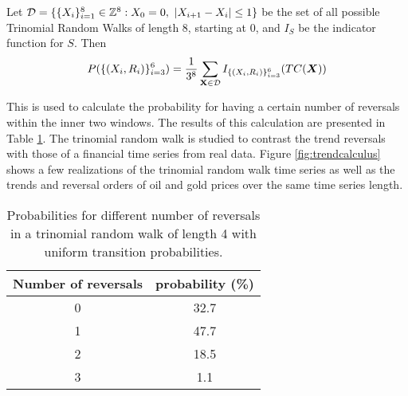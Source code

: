 \documentclass[../trend-calculus.tex]{subfiles}
\begin{document}
  Let $\mathcal{D} = \{ \{X_i\}_{i=1}^8 \in \mathbb{Z}^8 : X_0 = 0,\ |X_{i+1} - X_i| \le 1 \}$ be 
  the set of all possible Trinomial Random Walks of length 8, starting at 0, and 
  $I_S$ be the indicator function for $S$.
  Then 
  \[ 
    P( \{ (X_i, R_i) \}_{i=3}^6 ) = 
      \frac{1}{3^8} \sum_{\textbf{X} \in \mathcal{D}} 
        I_{ \{ (X_i, R_i) \}_{i=3}^6 } (TC(\X)) 
  \]

  This is used to calculate the probability for
  having a certain number of reversals within the inner two windows.
  The results of this calculation are presented in Table \ref{tab:tc-showcase}.
  The trinomial random walk is studied to contrast the trend reversals with those of
  a financial time series from real data.
  Figure \ref{fig:trendcalculus} shows a few realizations of
  the trinomial random walk time series as well as the trends
  and reversal orders of oil and gold prices over the same time series length.

  \begin{table}
    \centering
    \begin{tabular}{|c|c|}
      \hline
      Number of reversals & probability (\%) \\
      \hline
      0 & 32.7 \\
      1 & 47.7 \\
      2 & 18.5 \\
      3 & 1.1 \\
      \hline
    \end{tabular}
    \caption{
      Probabilities for different number of reversals in a
      trinomial random walk of length 4 with uniform transition probabilities.
    }
    \label{tab:tc-showcase}
  \end{table}

  
\end{document}
